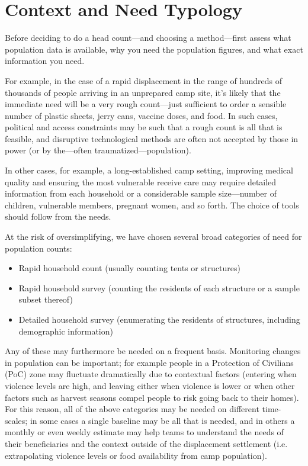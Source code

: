 \documentclass[a4paper,12pt,twoside]{article}
\begin{document}
\section{Context and Need Typology}
\begin{multicols}{2}
Before deciding to do a head count---and choosing a method---first assess what population data is available, why you need the population figures, and what exact information you need. 

For example, in the case of a rapid displacement in the range of hundreds of thousands of people arriving in an unprepared camp site, it's likely that the immediate need will be a very rough count---just sufficient to order a sensible number of plastic sheets, jerry cans, vaccine doses, and food. In such cases, political and access constraints may be such that a rough count is all that is feasible, and disruptive technological methods are often not accepted by those in power (or by the---often traumatized---population).

In other cases, for example, a long-established camp setting, improving medical quality and ensuring the most vulnerable receive care may require detailed information from each household or a considerable sample size---number of children, vulnerable members, pregnant women, and so forth. The choice of tools should follow from the needs.

\end{multicols}

\newpage
At the risk of oversimplifying, we have chosen several broad categories of need for population counts:
\begin{itemize}
    \item Rapid household count (usually counting tents or structures)
    \item Rapid household survey (counting the residents of each structure or a sample subset thereof)
    \item Detailed household survey (enumerating the residents of structures, including demographic information)
\end{itemize}

Any of these may furthermore be needed on a frequent basis. Monitoring changes in population can be important; for example people in a Protection of Civilians (PoC) zone may fluctuate dramatically due to contextual factors (entering when violence levels are high, and leaving either when violence is lower or when other factors such as harvest seasons compel people to risk going back to their homes). For this reason, all of the above categories may be needed on different time-scales; in some cases a single baseline may be all that is needed, and in others a monthly or even weekly estimate may help teams to understand the needs of their beneficiaries and the context outside of the displacement settlement (i.e. extrapolating violence levels or food availability from camp population). 
\end{document}
